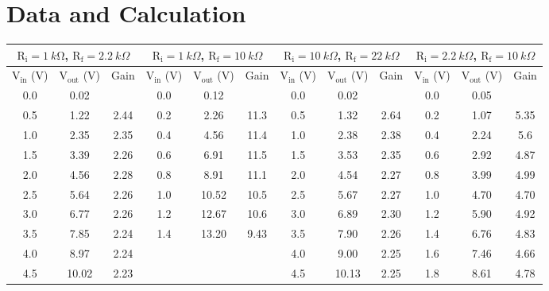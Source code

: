 \documentclass{scrartcl}
\begin{document}
\section{Data and Calculation}
\begin{table}[h!]
    \centering
    \small %
    \begin{tabular}{|c|c|c|c|c|c|c|c|c|c|c|c|}
    \hline
    \multicolumn{3}{|c|}{$\mathrm{R_i} = \SI{1}{k\ohm}$, $\mathrm{R_f} = \SI{2.2}{k\Omega}$} & 
    \multicolumn{3}{c|}{$\mathrm{R_i} = \SI{1}{k\Omega}$, $\mathrm{R_f} = \SI{10}{k\Omega}$} & 
    \multicolumn{3}{c|}{$\mathrm{R_i} = \SI{10}{k\Omega}$, $\mathrm{R_f} = \SI{22}{k\Omega}$} & 
    \multicolumn{3}{c|}{$\mathrm{R_i} = \SI{2.2}{k\Omega}$, $\mathrm{R_f} = \SI{10}{k\Omega}$} \\ \hline
    {$\mathrm{V_{\text{in}}}$ (V)} & {$\mathrm{V_{\text{out}}}$ (V)} & {Gain} & 
    {$\mathrm{V_{\text{in}}}$ (V)} & {$\mathrm{V_{\text{out}}}$ (V)} & {Gain} & 
    {$\mathrm{V_{\text{in}}}$ (V)} & {$\mathrm{V_{\text{out}}}$ (V)} & {Gain} & 
    {$\mathrm{V_{\text{in}}}$ (V)} & {$\mathrm{V_{\text{out}}}$ (V)} & {Gain} \\ \hline
    0.0    & 0.02  & \textemdash{} & 0.0    & 0.12  & \textemdash{} & 0.0    & 0.02  & \textemdash{} & 0.0    & 0.05  & \textemdash{} \\ \hline
    0.5  & 1.22  & 2.44  & 0.2  & 2.26  & 11.3  & 0.5  & 1.32  & 2.64  & 0.2  & 1.07  & 5.35  \\ \hline
    1.0    & 2.35  & 2.35  & 0.4  & 4.56  & 11.4  & 1.0    & 2.38  & 2.38  & 0.4  & 2.24  & 5.6   \\ \hline
    1.5  & 3.39  & 2.26  & 0.6  & 6.91  & 11.5  & 1.5  & 3.53  & 2.35  & 0.6  & 2.92  & 4.87  \\ \hline
    2.0   & 4.56  & 2.28  & 0.8  & 8.91  & 11.1  & 2.0    & 4.54  & 2.27  & 0.8  & 3.99  & 4.99  \\ \hline
    2.5  & 5.64  & 2.26  & 1.0  & 10.52 & 10.5  & 2.5  & 5.67  & 2.27  & 1.0  & 4.70  & 4.70  \\ \hline
    3.0    & 6.77  & 2.26  & 1.2  & 12.67 & 10.6  & 3.0  & 6.89  & 2.30  & 1.2  & 5.90  & 4.92  \\ \hline
    3.5  & 7.85  & 2.24  & 1.4  & 13.20 & 9.43  & 3.5  & 7.90  & 2.26  & 1.4  & 6.76  & 4.83  \\ \hline
    4.0    & 8.97  & 2.24  &      &       &       & 4.0  & 9.00  & 2.25  & 1.6  & 7.46  & 4.66  \\ \hline
    4.5  & 10.02 & 2.23  &      &       &       & 4.5  & 10.13 & 2.25  & 1.8  & 8.61  & 4.78  \\ \hline

\end{tabular}
\end{table}
\end{document}

